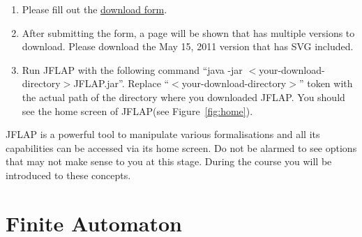 \documentclass[11pt]{article}
\newcommand{\name}[1]{{\textsf{#1}}}
\newcommand{\jflap}{\name{JFLAP}\xspace}
\begin{document}
\begin{enumerate}
  \item Please fill out the \href{http://www.cs.duke.edu/csed/jflap/log/form.php}{download form}.
  \item After submitting the form, a page will be shown that has multiple versions to download. Please download the May 15, 2011 version that has SVG included.
  \item \label{cmd:run} Run \jflap with the following command ``java -jar $<$your-download-directory$>$JFLAP.jar''. Replace ``$<$your-download-directory$>$'' token with the actual path of the directory where you downloaded \jflap. You should see the home screen of \jflap (see Figure~\ref{fig:home}).
\end{enumerate}

\jflap is a powerful tool to manipulate various formalisations and all its capabilities can be accessed via its home screen. Do not be alarmed to see options that may not make sense to you at this stage. During the course you will be introduced to these concepts.




\newpage
\section{Finite Automaton}
\end{document}
